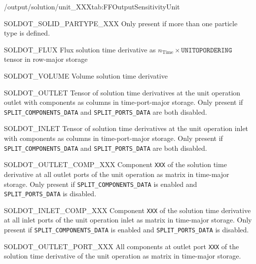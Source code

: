 \begin{groupscope}{/output/solution/unit\_XXX}{tab:FFOutputSensitivityUnit}
\begin{dataset}[type=double,unit={\si{\mol\per\cubic\metre\of{SP}\per\second}}]{SOLDOT\_SOLID\_PARTYPE\_XXX}
    Only present if more than one particle type is defined.
  \end{dataset}
  \begin{dataset}[type=double,unit={\si{\mol\per\square\metre\per\square\second}}]{SOLDOT\_FLUX}
    Flux solution time derivative as $n_{\text{Time}} \times \texttt{UNITOPORDERING}$ tensor in row-major storage
  \end{dataset}
  \begin{dataset}[type=double,unit={\si{\cubic\metre\per\second}}]{SOLDOT\_VOLUME}
    Volume solution time derivative 
  \end{dataset}
  \begin{dataset}[type=double,unit={\si{\mol\per\cubic\metre\of{IV}\per\second}}]{SOLDOT\_OUTLET}
    Tensor of solution time derivatives at the unit operation outlet with components as columns in time-port-major storage.
    Only present if \texttt{SPLIT\_COMPONENTS\_DATA} and \texttt{SPLIT\_PORTS\_DATA} are both disabled.
  \end{dataset}
  \begin{dataset}[type=double,unit={\si{\mol\per\cubic\metre\of{IV}\per\second}}]{SOLDOT\_INLET}
    Tensor of solution time derivatives at the unit operation inlet with components as columns in time-port-major storage.
    Only present if \texttt{SPLIT\_COMPONENTS\_DATA} and \texttt{SPLIT\_PORTS\_DATA} are both disabled.
  \end{dataset}
  \begin{dataset}[type=double,unit={\si{\mol\per\cubic\metre\of{IV}\per\second}}]{SOLDOT\_OUTLET\_COMP\_XXX}
    Component \texttt{XXX} of the solution time derivative at all outlet ports of the unit operation as matrix in time-major storage.
    Only present if \texttt{SPLIT\_COMPONENTS\_DATA} is enabled and \texttt{SPLIT\_PORTS\_DATA} is disabled.
  \end{dataset}
  \begin{dataset}[type=double,unit={\si{\mol\per\cubic\metre\of{IV}\per\second}}]{SOLDOT\_INLET\_COMP\_XXX}
    Component \texttt{XXX} of the solution time derivative at all inlet ports of the unit operation inlet as matrix in time-major storage.
    Only present if \texttt{SPLIT\_COMPONENTS\_DATA} is enabled and \texttt{SPLIT\_PORTS\_DATA} is disabled.
  \end{dataset}
  \begin{dataset}[type=double,unit={\si{\mol\per\cubic\metre\of{IV}\per\second}}]{SOLDOT\_OUTLET\_PORT\_XXX}
    All components at outlet port \texttt{XXX} of the solution time derivative of the unit operation as matrix in time-major storage.

\end{dataset}
\end{groupscope}
